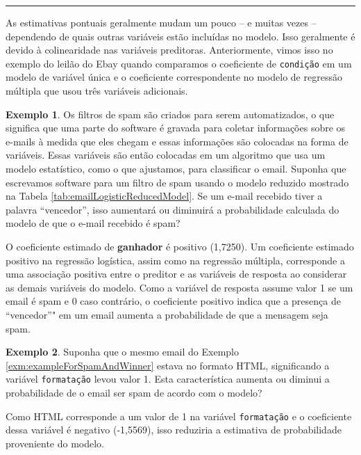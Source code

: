 \documentclass[
]{book}
\theoremstyle{definition}
\theoremstyle{definition}
\newtheorem{example}{Exemplo}[chapter]
\theoremstyle{definition}
\theoremstyle{definition}
\theoremstyle{remark}
\begin{document}
\begin{center}\rule{0.5\linewidth}{0.5pt}\end{center}

As estimativas pontuais geralmente mudam um pouco -- e muitas vezes -- dependendo de quais outras variáveis estão incluídas no modelo. Isso geralmente é devido à colinearidade nas variáveis preditoras. Anteriormente, vimos isso no exemplo do leilão do Ebay quando comparamos o coeficiente de \texttt{condição} em um modelo de variável única e o coeficiente correspondente no modelo de regressão múltipla que usou três variáveis adicionais.

\begin{example}
\protect\hypertarget{exm:exampleForSpamAndWinner}{}{\label{exm:exampleForSpamAndWinner} }Os filtros de spam são criados para serem automatizados, o que significa que uma parte do software é gravada para coletar informações sobre os e-mails à medida que eles chegam e essas informações são colocadas na forma de variáveis. Essas variáveis são então colocadas em um algoritmo que usa um modelo estatístico, como o que ajustamos, para classificar o email. Suponha que escrevamos software para um filtro de spam usando o modelo reduzido mostrado na Tabela \ref{tab:emailLogisticReducedModel}. Se um e-mail recebido tiver a palavra ``vencedor'', isso aumentará ou diminuirá a probabilidade calculada do modelo de que o e-mail recebido é spam?
\end{example}

O coeficiente estimado de \textbf{ganhador} é positivo (1,7250). Um coeficiente estimado positivo na regressão logística, assim como na regressão múltipla, corresponde a uma associação positiva entre o preditor e as variáveis de resposta ao considerar as demais variáveis do modelo. Como a variável de resposta assume valor 1 se um email é spam e 0 caso contrário, o coeficiente positivo indica que a presença de ``vencedor''" em um email aumenta a probabilidade de que a mensagem seja spam.

\begin{example}
\protect\hypertarget{exm:exampleForSpamAndFormat}{}{\label{exm:exampleForSpamAndFormat} }Suponha que o mesmo email do Exemplo \ref{exm:exampleForSpamAndWinner} estava no formato HTML, significando a variável \texttt{formatação} levou valor 1. Esta característica aumenta ou diminui a probabilidade de o email ser spam de acordo com o modelo?
\end{example}

Como HTML corresponde a um valor de 1 na variável \texttt{formatação} e o coeficiente dessa variável é negativo (-1,5569), isso reduziria a estimativa de probabilidade proveniente do modelo.
\end{document}
